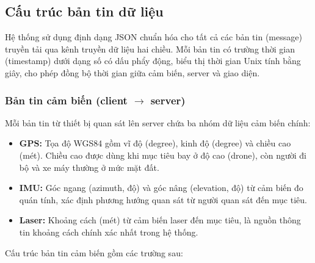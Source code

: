 \subsection{Cấu trúc bản tin dữ liệu}

\hspace{0.5cm} Hệ thống sử dụng định dạng JSON chuẩn hóa cho tất cả các bản tin (message) truyền tải qua kênh truyền dữ liệu hai chiều. Mỗi bản tin có trường thời gian (timestamp) dưới dạng số có dấu phẩy động, biểu thị thời gian Unix tính bằng giây, cho phép đồng bộ thời gian giữa cảm biến, server và giao diện.

\subsubsection{Bản tin cảm biến (client \texorpdfstring{$\to$}{to} server)}

\hspace{0.5cm} Mỗi bản tin từ thiết bị quan sát lên server chứa ba nhóm dữ liệu cảm biến chính:

\begin{itemize}
    \item \textbf{GPS:} Tọa độ WGS84 gồm vĩ độ (degree), kinh độ (degree) và chiều cao (mét). Chiều cao được dùng khi mục tiêu bay ở độ cao (drone), còn người đi bộ và xe máy thường ở mức mặt đất.

    \item \textbf{IMU:} Góc ngang (azimuth, độ) và góc nâng (elevation, độ) từ cảm biến đo quán tính, xác định phương hướng quan sát từ người quan sát đến mục tiêu.

    \item \textbf{Laser:} Khoảng cách (mét) từ cảm biến laser đến mục tiêu, là nguồn thông tin khoảng cách chính xác nhất trong hệ thống.
\end{itemize}

Cấu trúc bản tin cảm biến gồm các trường sau:

\begin{table}[H]
\centering
{}
\caption{Các trường chính trong bản tin cảm biến}
\label{tab:msg-fields}
\end{table}

